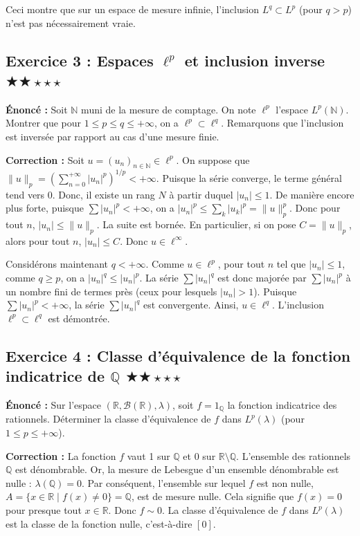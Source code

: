 \documentclass[11pt,a4paper]{article}
\begin{document}
Ceci montre que sur un espace de mesure infinie, l'inclusion $L^q \subset L^p$ (pour $q > p$) n'est pas nécessairement vraie.


\subsection*{Exercice 3 : Espaces $\ell^p$ et inclusion inverse \quad $\bigstar\bigstar\star\star\star$}

\textbf{Énoncé :}
Soit $\mathbb{N}$ muni de la mesure de comptage. On note $\ell^p$ l'espace $L^p(\mathbb{N})$.
Montrer que pour $1 \le p \le q \le +\infty$, on a $\ell^p \subset \ell^q$.
Remarquons que l'inclusion est inversée par rapport au cas d'une mesure finie.

\textbf{Correction :}
Soit $u = (u_n)_{n \in \mathbb{N}} \in \ell^p$. On suppose que $\|u\|_p = \left( \sum_{n=0}^{+\infty} |u_n|^p \right)^{1/p} < +\infty$.
Puisque la série converge, le terme général tend vers 0. Donc, il existe un rang $N$ à partir duquel $|u_n| \le 1$.
De manière encore plus forte, puisque $\sum |u_n|^p < +\infty$, on a $|u_n|^p \le \sum_{k} |u_k|^p = \|u\|_p^p$.
Donc pour tout $n$, $|u_n| \le \|u\|_p$. La suite est bornée.
En particulier, si on pose $C = \|u\|_p$, alors pour tout $n$, $|u_n| \le C$. Donc $u \in \ell^\infty$.

Considérons maintenant $q < +\infty$. Comme $u \in \ell^p$, pour tout $n$ tel que $|u_n| \le 1$, comme $q \ge p$, on a $|u_n|^q \le |u_n|^p$.
La série $\sum |u_n|^q$ est donc majorée par $\sum |u_n|^p$ à un nombre fini de termes près (ceux pour lesquels $|u_n| > 1$).
Puisque $\sum |u_n|^p < +\infty$, la série $\sum |u_n|^q$ est convergente.
Ainsi, $u \in \ell^q$. L'inclusion $\ell^p \subset \ell^q$ est démontrée.


\subsection*{Exercice 4 : Classe d'équivalence de la fonction indicatrice de $\mathbb{Q}$ \quad $\bigstar\bigstar\star\star\star$}

\textbf{Énoncé :}
Sur l'espace $(\mathbb{R}, \mathcal{B}(\mathbb{R}), \lambda)$, soit $f = 1_{\mathbb{Q}}$ la fonction indicatrice des rationnels.
Déterminer la classe d'équivalence de $f$ dans $L^p(\lambda)$ (pour $1 \le p \le +\infty$).

\textbf{Correction :}
La fonction $f$ vaut 1 sur $\mathbb{Q}$ et 0 sur $\mathbb{R} \setminus \mathbb{Q}$.
L'ensemble des rationnels $\mathbb{Q}$ est dénombrable.
Or, la mesure de Lebesgue d'un ensemble dénombrable est nulle : $\lambda(\mathbb{Q}) = 0$.
Par conséquent, l'ensemble sur lequel $f$ est non nulle, $A = \{x \in \mathbb{R} \mid f(x) \neq 0\} = \mathbb{Q}$, est de mesure nulle.
Cela signifie que $f(x) = 0$ pour presque tout $x \in \mathbb{R}$.
Donc $f \sim 0$.
La classe d'équivalence de $f$ dans $L^p(\lambda)$ est la classe de la fonction nulle, c'est-à-dire $[0]$.
\end{document}
